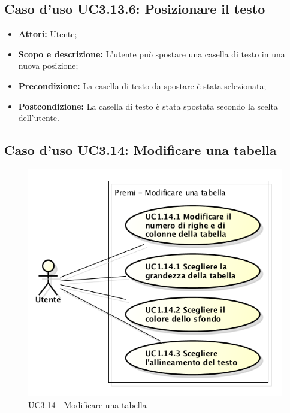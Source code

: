 \subsection{Caso d'uso UC3.13.6: Posizionare il testo}
\begin{itemize}
	\item \textbf{Attori:} Utente;
	\item \textbf{Scopo e descrizione:} L'utente può spostare una casella di testo in una nuova posizione;
	\item \textbf{Precondizione:} La casella di testo da spostare è stata selezionata;
	\item \textbf{Postcondizione:} La casella di testo è stata spostata secondo la scelta dell'utente.
\end{itemize}

\subsection{Caso d'uso UC3.14: Modificare una tabella}
\begin{figure}[h] 
	\centering 
	\includegraphics[scale=0.45] {img/UC3.14.png} 
	\caption{UC3.14 - Modificare una tabella} 
\end{figure}


